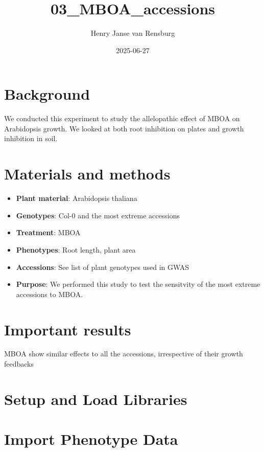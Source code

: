 \documentclass[
  11pt,
]{article}
\title{03\_MBOA\_accessions}
\author{Henry Janse van Rensburg}
\date{2025-06-27}
\renewcommand*\contentsname{Table of contents}
\newcommand\contentsname{Table of contents}
\begin{document}
\maketitle

\renewcommand*\contentsname{Table of contents}
{
\hypersetup{linkcolor=}
\setcounter{tocdepth}{2}
\tableofcontents
}

\section{Background}\label{background}

We conducted this experiment to study the allelopathic effect of MBOA on
Arabidopsis growth. We looked at both root inhibition on plates and
growth inhibition in soil.

\section{Materials and methods}\label{materials-and-methods}

\begin{itemize}
\item
  \textbf{Plant material}: Arabidopsis thaliana
\item
  \textbf{Genotypes}: Col-0 and the most extreme accessions
\item
  \textbf{Treatment}: MBOA
\item
  \textbf{Phenotypes}: Root length, plant area
\item
  \textbf{Accessions}: See list of plant genotypes used in GWAS
\item
  \textbf{Purpose}: We performed this study to test the sensitvity of
  the most extreme accessions to MBOA.
\end{itemize}

\section{Important results}\label{important-results}

MBOA show similar effects to all the accessions, irrespective of their
growth feedbacks

\section{Setup and Load Libraries}\label{setup-and-load-libraries}

\section{Import Phenotype Data}\label{import-phenotype-data}
\end{document}
